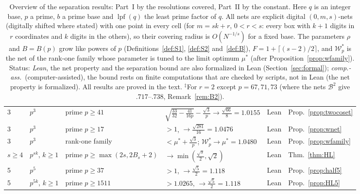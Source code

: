 \documentclass[11pt]{amsart}
\theoremstyle{definition}
\theoremstyle{plain}
\begin{document}
\begin{table}[tbp]
\begin{tabular}{@{}llllll@{}}
3 & $p^{3}$ & prime $p\ge41$ & $\sqrt{\frac{33}{32}-\frac{41}{16p}}-\frac{\sqrt3}p\to\frac{\sqrt{66}}8=1.0155$ & Lean & Prop.~\ref{prop:twocoset}\\
3 & $p^{3}$ & prime $p\ge17$ & $>1$, $\to\frac{\sqrt{281}}{16}=1.0476$ & Lean & Prop.~\ref{prop:wnet}\\
3 & $p^{3}$ & rank-one family & $<\mu^*+\frac{\sqrt3}p$; $\mathcal W^*_p\to\mu^*=1.0480$ & Lean & Prop.~\ref{prop:wfamily}\\
$s\ge4$ & $p^{sk}$, $k\ge1$ & prime $p\ge\max(2s,2B_s+2)$ & $\to\min(\frac{\sqrt s}2,\sqrt2)$ & Lean & Thm.~\ref{thm:HL}\\
5 & $p^{5}$ & prime $p\ge37$ & $>1$, $\to\frac{\sqrt5}2=1.118$ & Lean & Prop.~\ref{prop:half5}\\
5 & $p^{5k}$, $k\ge1$ & prime $p\ge1511$ & $>1.0265$, $\to\frac{\sqrt5}2=1.118$ & Lean & Prop.~\ref{prop:HL5}\\
\bottomrule
\end{tabular}
\medskip
\caption{Overview of the separation results: Part~I by the resolutions covered, Part~II by the constant. Here $q$ is an integer base, $p$ a prime, $b$ a prime base and $\operatorname{lpf}(q)$ the least prime factor of $q$. All nets are explicit digital $(0,m,s)$-nets (digitally shifted where stated) with one point in every cell (for $m=sk+r$, $0<r<s$: every box with $k+1$ digits in $r$ coordinates and $k$ digits in the others), so their covering radius is $O(N^{-1/s})$ for a fixed base. The parameters $\rho$ and $B=B(p)$ grow like powers of $p$ (Definitions~\ref{def:S1}, \ref{def:S2} and~\ref{def:B}), $F=1+\lceil(s-2)/2\rceil$, and $\mathcal W^*_p$ is the net of the rank-one family whose parameter is tuned to the limit optimum $\mu^*$ (after Proposition~\ref{prop:wfamily}). Status: \emph{Lean}, the net property and the separation bound are also formalized in Lean (Section~\ref{sec:formal}); \emph{comp.-ass.}\ (computer-assisted), the bound rests on finite computations that are checked by scripts, not in Lean (the net property is formalized). All results are proved in the text. ${}^{\ddagger}$For $r=2$ except $p=67,71,73$ (where the nets $\mathcal B^2$ give $.717$--$.738$, Remark~\ref{rem:B2}).}
\label{tab:overview}
\end{table}
\end{document}
